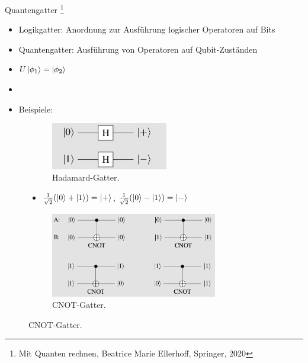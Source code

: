 \documentclass[aspectratio=1610, 9pt]{beamer}
\begin{document}
\begin{frame}{Quantengatter \footnote[200]{Mit Quanten rechnen, Beatrice Marie Ellerhoff, Springer, 2020}}
  \begin{itemize}
    \item Logikgatter: Anordnung zur Ausführung logischer Operatoren auf Bits
    \item Quantengatter: Ausführung von Operatoren auf Qubit-Zuständen
    \item $U \ket{\phi_1} = \ket{\phi_2}$
    \item[]
    \item Beispiele:
  \end{itemize}
  \begin{figure}
    \begin{minipage}{0.49\textwidth}
      \begin{figure}
          \includegraphics[width=0.56\textwidth]{images/Hadamard.png}
          \caption{Hadamard-Gatter. \footnotemark[200]}
      \end{figure}
      \begin{itemize}
        \item[] $\frac{1}{\sqrt{2}} (\ket{0} + \ket{1}) = \ket{+}$,  $\frac{1}{\sqrt{2}} (\ket{0} - \ket{1}) = \ket{-}$
      \end{itemize}
    \end{minipage}
    \hfill
    \begin{minipage}{0.49\textwidth}
      \begin{figure}
          \includegraphics[width=0.8\textwidth]{images/CNOT.png}
          \caption{CNOT-Gatter. \footnotemark[200]}
      \end{figure}
    \end{minipage}
  \end{figure}
\end{frame}
\end{document}
